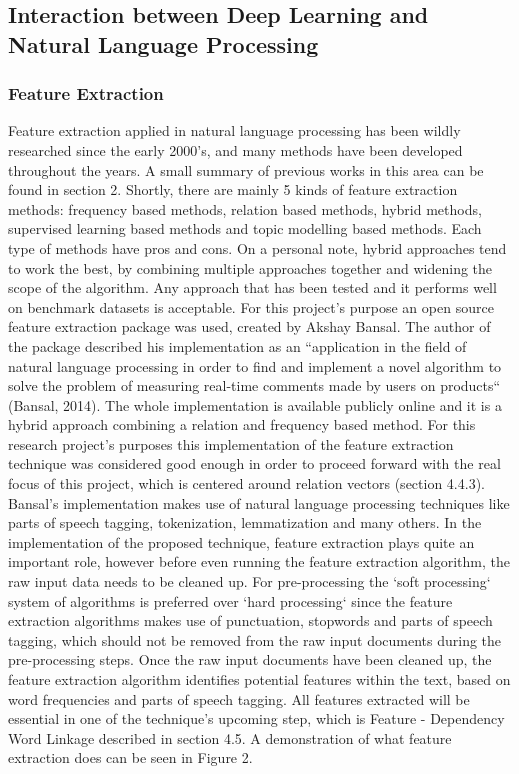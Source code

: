\documentclass{sig-alternate}
\begin{document}
\subsection{Interaction between Deep Learning and Natural Language Processing}
\subsubsection{Feature Extraction}
Feature extraction applied in natural language processing has been wildly researched since the early 2000's, and many methods have been developed throughout the years. A small summary of previous works in this area can be found in section 2. Shortly, there are mainly 5 kinds of feature extraction methods: frequency based methods, relation based methods, hybrid methods, supervised learning based methods and topic modelling based methods. Each type of methods have pros and cons. On a personal note, hybrid approaches tend to work the best, by combining multiple approaches together and widening the scope of the algorithm. Any approach that has been tested and it performs well on benchmark datasets is acceptable. For this project's purpose an open source feature extraction package was used, created by Akshay Bansal. The author of the package described his implementation as an ``application in the field of natural language processing in order to find and implement a novel algorithm to solve the problem of measuring real-time comments made by users on products``  (Bansal, 2014). The whole implementation is available publicly online and it is a hybrid approach combining a relation and frequency based method. For this research project's purposes this implementation of the feature extraction technique was considered good enough in order to proceed forward with the real focus of this project, which is centered around relation vectors (section 4.4.3). Bansal's implementation makes use of natural language processing techniques like parts of speech tagging, tokenization, lemmatization and many others. 
In the implementation of the proposed technique, feature extraction plays quite an important role, however before even running the feature extraction algorithm, the raw input data needs to be cleaned up. For pre-processing the `soft processing` system of algorithms is preferred over `hard processing` since the feature extraction algorithms makes use of punctuation, stopwords and parts of speech tagging, which should not be removed from the raw input documents during the pre-processing steps. Once the raw input documents have been cleaned up, the feature extraction algorithm identifies potential features within the text, based on word frequencies and parts of speech tagging. All features extracted will be essential in one of the technique's upcoming step, which is Feature - Dependency Word Linkage described in section 4.5. A demonstration of what feature extraction does can be seen in Figure 2.
\end{document}
